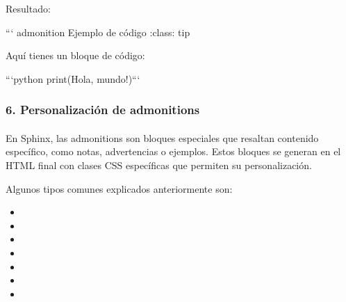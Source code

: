 \documentclass[a4paper,10pt,oneside,spanish,openany]{sphinxmanual}
\begin{document}
\begin{sphinxVerbatim}[commandchars=\\\{\}]

Resultado:

``` \PYGZob{}admonition\PYGZcb{} Ejemplo de código
:class: tip

Aquí tienes un bloque de código:

    ```python
    print(\PYGZdq{}Hola, mundo!\PYGZdq{})```
\end{sphinxVerbatim}


\subsubsection{6. Personalización de admonitions}
\label{\detokenize{configuracion_inicial/013.guia_de_myst_parser:personalizacion-de-admonitions}}

\paragraph{}
\label{\detokenize{configuracion_inicial/013.guia_de_myst_parser:entender-la-estructura-de-admonitions-en-sphinx}}
\sphinxAtStartPar
En Sphinx, las admonitions son bloques especiales que resaltan contenido específico, como notas, advertencias o ejemplos. Estos bloques se generan en el HTML final con clases CSS específicas que permiten su personalización.

\sphinxAtStartPar
Algunos tipos comunes explicados anteriormente son:
\begin{itemize}
\item {} 
\sphinxAtStartPar
{}

\item {} 
\sphinxAtStartPar
{}

\item {} 
\sphinxAtStartPar
{}

\item {} 
\sphinxAtStartPar
{}

\item {} 
\sphinxAtStartPar
{}

\item {} 
\sphinxAtStartPar
{}

\item {} 
\sphinxAtStartPar
{}

\end{itemize}
\end{document}
